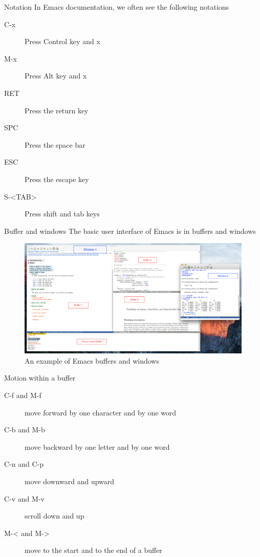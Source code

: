 \documentclass[presentation]{beamer}
\begin{document}
\begin{frame}[label={sec:org5232f40}]{Notation}
In Emacs documentation, we often see the following notations

\begin{description}
\item[{C-x}] Press Control key and x
\item[{M-x}] Press Alt key and x
\item[{RET}] Press the return key
\item[{SPC}] Press the space bar
\item[{ESC}] Press the escape key
\item[{S-<TAB>}] Press shift and tab keys
\end{description}
\end{frame}

\begin{frame}[label={sec:org3bd6e39}]{Buffer and windows}
The basic user interface of Emacs is in buffers and windows

\begin{figure}[htbp]
\centering
\includegraphics[width=1.0\textwidth,height=0.8\textheight]{figure/buffer_example.png}
\caption{An example of Emacs buffers and windows}
\end{figure}
\end{frame}

\begin{frame}[label={sec:org3c905d3}]{Motion within a buffer}
\begin{description}
\item[{C-f and M-f}] move forward by one character and by one word
\item[{C-b and M-b}] move backward by one letter and by one word
\item[{C-n and C-p}] move downward and upward
\item[{C-v and M-v}] scroll down and up
\item[{M-< and M->}] move to the start and to the end of a buffer
\end{description}
\end{frame}
\end{document}
